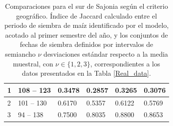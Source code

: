 \begin{table}[]
\begin{tabular}{llllll}
		\multicolumn{1}{l|}{1}                                  & \multicolumn{1}{l|}{108 -- 123}                                                                                               & \multicolumn{1}{l|}{0.3478}                  & \multicolumn{1}{l|}{0.2857}                 & \multicolumn{1}{l|}{0.3265}                  & 0.3076                 \\ \hline
		\multicolumn{1}{l|}{2}                                  & \multicolumn{1}{l|}{101 -- 130}                                                                                               & \multicolumn{1}{l|}{0.6170}                  & \multicolumn{1}{l|}{0.5357}                 & \multicolumn{1}{l|}{0.6122}                  & 0.5769                 \\ \hline
		\multicolumn{1}{l|}{3}                                  & \multicolumn{1}{l|}{94 -- 138}                                                                                                & \multicolumn{1}{l|}{0.7500}                  & \multicolumn{1}{l|}{0.8035}                 & \multicolumn{1}{l|}{0.8800}                  & 0.8653                 \\ \hline
	\end{tabular}
	\caption{Comparaciones para el sur de Sajonia según el criterio geográfico. Índice de Jaccard calculado entre el periodo de siembra de maíz identificado por el modelo, acotado al primer semestre del año, y los conjuntos de fechas de siembra definidos por intervalos de semiancho $\nu$ desviaciones estándar respecto a la media muestral, con $\nu\in\{1,2,3\}$, correspondientes a los datos presentados en la Tabla \ref{Real_data}.}
	\label{Tab:Comparions_South_Saxony_Geo}
\end{table}


